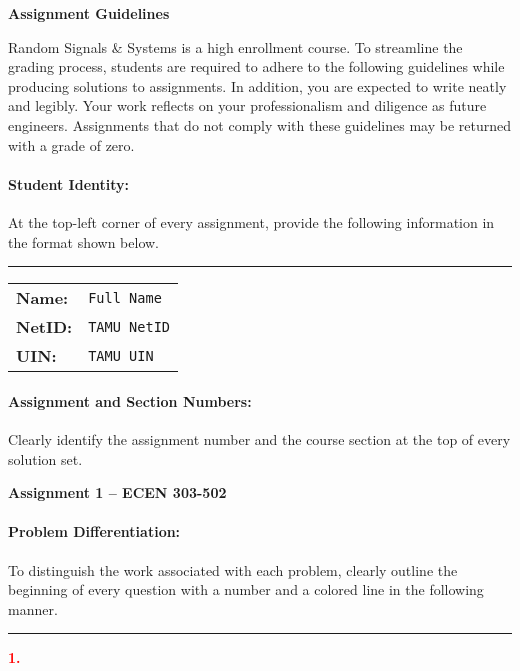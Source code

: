 \documentclass[11pt]{article}
\begin{document}
\begin{center}
{\bfseries \LARGE Assignment Guidelines}
\end{center}

Random Signals \& Systems is a high enrollment course.
To streamline the grading process, students are required to adhere to the following guidelines while producing solutions to assignments.
In addition, you are expected to write neatly and legibly.
Your work reflects on your professionalism and diligence as future engineers.
Assignments that do not comply with these guidelines may be returned with a grade of zero.


\paragraph{Student Identity:} At the top-left corner of every assignment, provide the following information in the format shown below.

\noindent
\rule[1mm]{\linewidth}{0.5pt}
\begin{tabular}{ll}
\textbf{Name:} & \texttt{Full Name} \\
\textbf{NetID:} & \texttt{TAMU NetID} \\
\textbf{UIN:} & \texttt{TAMU UIN}
\end{tabular}


\paragraph{Assignment and Section Numbers:}
Clearly identify the assignment number and the course section at the top of every solution set.
\begin{center}
\begin{Large}
\textbf{Assignment 1 -- ECEN 303-502}
\end{Large}
\end{center}


\paragraph{Problem Differentiation:}
To distinguish the work associated with each problem, clearly outline the beginning of every question with a number and a colored line in the following manner.

\noindent
\textcolor{red}{\rule[1mm]{\linewidth}{1pt}}
\begin{Large}
\textcolor{red}{\textbf{1.}}
\end{Large}
\end{document}
